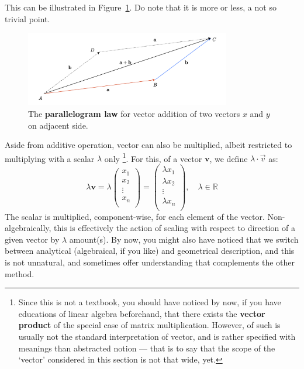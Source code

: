 This can be illustrated in Figure~\ref{fig:vector_sum_parallel}. Do note that it is more or less, a not so trivial point. 
\begin{figure}[h!]
    \centering
    \includegraphics[width=0.8\textwidth]{img/vector_sum-001.png}
    \caption{The \textbf{parallelogram law} for vector addition of two vectors $x$ and $y$ on adjacent side.}
    \label{fig:vector_sum_parallel}
\end{figure}
Aside from additive operation, vector can also be multiplied, albeit restricted to multiplying with a scalar $\lambda$ only \footnote{Since this is not a textbook, you should have noticed by now, if you have educations of linear algebra beforehand, that there exists the \textbf{vector product} of the special case of matrix multiplication. However, of such is usually not the standard interpretation of vector, and is rather specified with meanings than abstracted notion --- that is to say that the scope of the `vector' considered in this section is not that wide, yet.}. For this, of a vector $\mathbf{v}$, we define $\lambda\cdot \vec{v}$ as: 
\begin{equation}
    \lambda\mathbf{v} = 
    \lambda\begin{pmatrix}
        x_{1}\\
        x_{2}\\
        \vdots\\
        x_{n}\\
    \end{pmatrix}
    =
    \begin{pmatrix}
        \lambda x_{1}\\
        \lambda x_{2}\\
        \vdots\\
        \lambda x_{n}\\
    \end{pmatrix}, \quad \lambda \in \mathbb{R}
\end{equation}
The scalar is multiplied, component-wise, for each element of the vector. Non-algebraically, this is effectively the action of scaling with respect to direction of a given vector by $\lambda$ amount(s). By now, you might also have noticed that we switch between analytical (algebraical, if you like) and geometrical description, and this is not unnatural, and sometimes offer understanding that complements the other method. 
